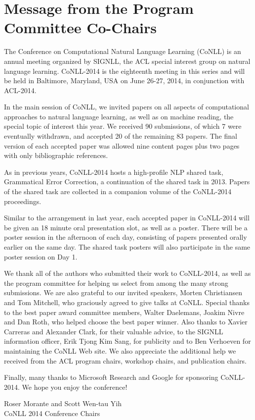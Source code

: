 \section*{Message from the Program Committee Co-Chairs}
\thispagestyle{emptyheader}

\setlength{\parskip}{.7ex}

The Conference on Computational Natural Language Learning (CoNLL) is
an annual meeting organized by SIGNLL, the ACL special interest group
on natural language learning. CoNLL-2014 is the eighteenth meeting in
this series and will be held in Baltimore, Maryland, USA on June
26-27, 2014, in conjunction with ACL-2014.

In the main session of CoNLL, we invited papers on all aspects of
computational approaches to natural language learning, as well as on
machine reading, the special topic of interest this year. We received
90 submissions, of which 7 were eventually withdrawn, and accepted 20
of the remaining 83 papers. The final version of each accepted paper
was allowed nine content pages plus two pages with only bibliographic
references.

As in previous years, CoNLL-2014 hosts a high-profile NLP shared task,
Grammatical Error Correction, a continuation of the shared task in
2013. Papers of the shared task are collected in a companion volume of
the CoNLL-2014 proceedings.

Similar to the arrangement in last year, each accepted paper in
CoNLL-2014 will be given an 18 minute oral presentation slot, as well
as a poster. There will be a poster session in the afternoon of each
day, consisting of papers presented orally earlier on the same
day. The shared task posters will also participate in the same poster
session on Day 1.

We thank all of the authors who submitted their work to CoNLL-2014, as
well as the program committee for helping us select from among the
many strong submissions. We are also grateful to our invited speakers,
Morten Christiansen and Tom Mitchell, who graciously agreed to give
talks at CoNLL. Special thanks to the best paper award committee
members, Walter Daelemans, Joakim Nivre and Dan Roth, who helped
choose the best paper winner. Also thanks to Xavier Carreras and
Alexander Clark, for their valuable advice, to the SIGNLL information
officer, Erik Tjong Kim Sang, for publicity and to Ben Verhoeven for
maintaining the CoNLL Web site. We also appreciate the additional help
we received from the ACL program chairs, workshop chairs, and
publication chairs.

Finally, many thanks to Microsoft Research and Google for sponsoring
CoNLL-2014. We hope you enjoy the conference!

\vspace{.2in}
\indent Roser Morante and Scott Wen-tau Yih\\
\indent CoNLL 2014 Conference Chairs
